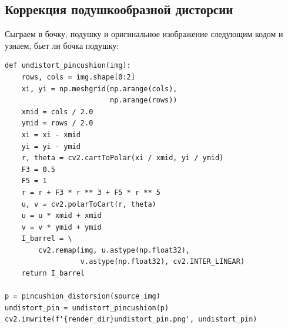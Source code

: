 \documentclass[a4paper, 16pt]{article}
\begin{document}
\subsection{Коррекция подушкообразной дисторсии}
\noindent Сыграем в бочку, подушку и оригинальное изображение следующим кодом и узнаем,
бьет ли бочка подушку:
\begin{lstlisting}[label=fixpin-code,caption=Код для коррекции подушкообразной дисторсии]
def undistort_pincushion(img):
    rows, cols = img.shape[0:2]
    xi, yi = np.meshgrid(np.arange(cols),
                         np.arange(rows))
    xmid = cols / 2.0
    ymid = rows / 2.0
    xi = xi - xmid
    yi = yi - ymid
    r, theta = cv2.cartToPolar(xi / xmid, yi / ymid)
    F3 = 0.5
    F5 = 1
    r = r + F3 * r ** 3 + F5 * r ** 5
    u, v = cv2.polarToCart(r, theta)
    u = u * xmid + xmid
    v = v * ymid + ymid
    I_barrel = \
        cv2.remap(img, u.astype(np.float32),
                  v.astype(np.float32), cv2.INTER_LINEAR)
    return I_barrel

p = pincushion_distorsion(source_img)
undistort_pin = undistort_pincushion(p)
cv2.imwrite(f'{render_dir}undistort_pin.png', undistort_pin)
\end{lstlisting}
\end{document}
